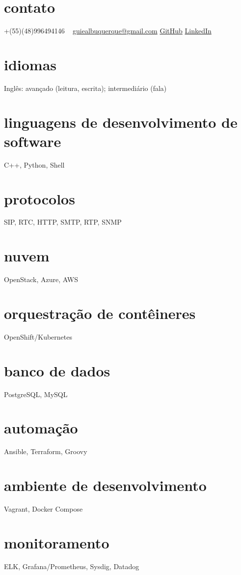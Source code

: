 \documentclass[]{friggeri-cv} %
\begin{document}



\begin{aside} %
\section{contato}
+(55)(48)996494146
~
\href{mailto:guiealbuquerque@gmail.com}{guiealbuquerque@gmail.com}
\href{https://github.com/heisendumb}{GitHub}
\href{https://www.linkedin.com/in/heisenbugger/}{LinkedIn}
\section{idiomas}
Inglês: avançado (leitura, escrita); intermediário (fala)
\section{linguagens de desenvolvimento de software}
C++, Python, Shell
\section{protocolos}
SIP, RTC, HTTP, SMTP, RTP, SNMP
\section{nuvem}
OpenStack, Azure, AWS
\section{orquestração de contêineres}
OpenShift/Kubernetes
\section{banco de dados}
PostgreSQL, MySQL
\section{automação}
Ansible, Terraform, Groovy
\section{ambiente de desenvolvimento}
Vagrant, Docker Compose
\section{monitoramento}
ELK, Grafana/Prometheus, Sysdig, Datadog
\end{aside}
\end{document}
